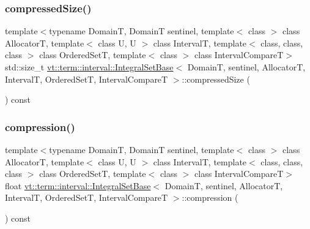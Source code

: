 \subsubsection{\texorpdfstring{compressed\+Size()}{compressedSize()}}
{\footnotesize\ttfamily template$<$typename DomainT, DomainT sentinel, template$<$ class $>$ class AllocatorT, template$<$ class U, U $>$ class IntervalT, template$<$ class, class, class $>$ class Ordered\+SetT, template$<$ class $>$ class Interval\+CompareT$>$ \\
std\+::size\+\_\+t \hyperlink{structvt_1_1term_1_1interval_1_1_integral_set_base}{vt\+::term\+::interval\+::\+Integral\+Set\+Base}$<$ DomainT, sentinel, AllocatorT, IntervalT, Ordered\+SetT, Interval\+CompareT $>$\+::compressed\+Size (\begin{DoxyParamCaption}{ }\end{DoxyParamCaption}) const\hspace{0.3cm}{\ttfamily [inline]}}

\mbox{\label{structvt_1_1term_1_1interval_1_1_integral_set_base_a1897d55d5f300ad209d2ce014240680d}} 
\subsubsection{\texorpdfstring{compression()}{compression()}}
{\footnotesize\ttfamily template$<$typename DomainT, DomainT sentinel, template$<$ class $>$ class AllocatorT, template$<$ class U, U $>$ class IntervalT, template$<$ class, class, class $>$ class Ordered\+SetT, template$<$ class $>$ class Interval\+CompareT$>$ \\
float \hyperlink{structvt_1_1term_1_1interval_1_1_integral_set_base}{vt\+::term\+::interval\+::\+Integral\+Set\+Base}$<$ DomainT, sentinel, AllocatorT, IntervalT, Ordered\+SetT, Interval\+CompareT $>$\+::compression (\begin{DoxyParamCaption}{ }\end{DoxyParamCaption}) const\hspace{0.3cm}{\ttfamily [inline]}}

\mbox{\label{structvt_1_1term_1_1interval_1_1_integral_set_base_aa44021f10057190693c22777749fc8c4}} 
